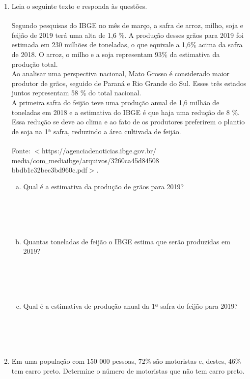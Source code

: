 \documentclass[a4paper,14pt]{article}
\begin{document}
\begin{multicols}{2}
\begin{enumerate}
			\item Leia o seguinte texto e responda às questões. \\\\
			\large Segundo pesquisas do IBGE no mês de março, a safra de arroz, milho, soja e feijão de 2019 terá uma alta de 1,6 \%. A produção desses grãos para 2019 foi estimada em 230 milhões de toneladas, o que equivale a 1,6\% acima da safra de 2018. O arroz, o milho e a soja representam 93\% da estimativa da produção total. \\
			Ao analisar uma perspectiva nacional, Mato Grosso é considerado maior produtor de grãos, seguido de Paraná e Rio Grande do Sul. Esses três estados juntos representam 58 \% do total nacional. \\
			A primeira safra do feijão teve uma produção anual de 1,6 milhão de toneladas em 2018 e a estimativa do IBGE é que haja uma redução de 8 \%. \\
			Essa redução se deve ao clima e ao fato de os produtores preferirem o plantio de soja na 1ª safra, reduzindo a área cultivada de feijão. \\\\
			\footnotesize Fonte: $<$https://agenciadenoticias.ibge.gov.br/\\media/com\underline{~}mediaibge/arquivos/3260ca45d84508\\bbdb1e32bec3bd960c.pdf$>$. \normalsize
			\begin{enumerate}[a)]
				\item Qual é a estimativa da produção de grãos para 2019? \\\\\\\\\\
				\item Quantas toneladas de feijão o IBGE estima que serão produzidas em 2019? \\\\\\\\\\
				\item Qual é a estimativa de produção anual da 1ª safra do feijão para 2019? \\\\\\\\\\
			\end{enumerate}
			\item Em uma população com 150 000 pessoas, 72\% são motoristas e, destes, 46\% tem carro preto. Determine o número de motoristas que não tem carro preto. \\\\\\\\\\
		\end{enumerate}
	\end{multicols}
\end{document}
